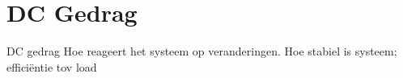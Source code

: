 \section{DC Gedrag}

DC gedrag
Hoe reageert het systeem op veranderingen. Hoe stabiel is systeem; efficiëntie tov load
